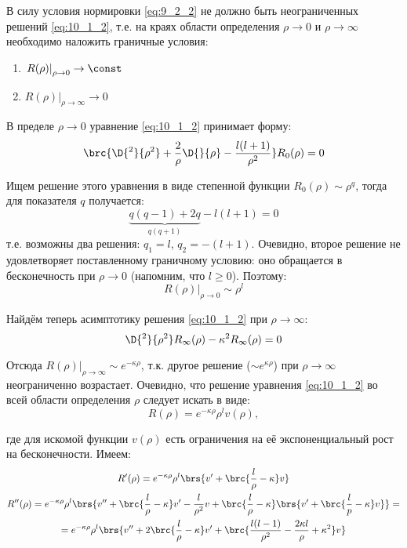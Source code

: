 В силу условия нормировки \eqref{eq:9_2_2} не должно быть неограниченных решений \eqref{eq:10_1_2}, т.е. на краях области определения $\rho \to 0$ и $\rho \to \infty$ необходимо наложить граничные условия:
\begin{enumerate}
\item $\left. R(\rho)\right|_{\rho \to 0} \to \const$
\item $\left. R(\rho)\right|_{\rho \to \infty} \to 0$
\end{enumerate}


В пределе $\rho \to 0$ уравнение \eqref{eq:10_1_2} принимает форму:
$$
\brc{\D{^2}{\rho^2} + \frac{2}{\rho}\D{}{\rho} - \frac{l(l+1)}{\rho^2}} R_0(\rho) = 0
$$

Ищем решение этого уравнения в виде степенной функции $R_0(\rho) \sim \rho^q$, тогда для показателя $q$ получается:
$$
\underbrace{q (q - 1) + 2q}_{q(q+1)} - l(l + 1) = 0
$$
т.е. возможны два решения: $q_1 = l$, $q_2 = -(l+1)$. Очевидно, второе решение не удовлетворяет поставленному граничному условию: оно обращается в бесконечность при $\rho \to 0$ (напомним, что $l \geqslant 0$). Поэтому:
$$
\boxed{
	\left. R(\rho)\right|_{\rho \to 0} \sim \rho^l
}
$$

Найдём теперь асимптотику решения \eqref{eq:10_1_2} при $\rho \to \infty$:
$$
\D{^2}{\rho^2}R_\infty(\rho) - \kappa^2 R_\infty(\rho) = 0
$$

Отсюда $\boxed{\left. R(\rho)\right|_{\rho \to \infty} \sim e^{-\kappa \rho}}$, т.к. другое решение ($\sim e^{\kappa \rho}$) при $\rho \to \infty$ неограниченно возрастает. Очевидно, что решение уравнения \eqref{eq:10_1_2} во всей области определения $\rho$ следует искать в виде:
\begin{equation}
\label{eq:10_2_1}
\boxed{
	R(\rho) = e^{-\kappa \rho} \rho^l v(\rho)
},
\end{equation}

где для искомой функции $v(\rho)$ есть ограничения на её экспоненциальный рост на бесконечности. Имеем:
$$
\begin{gathered}
R'(\rho) = e^{-\kappa \rho} \rho^l \brs{v' + \brc{\frac{l}{\rho} - \kappa} v}\\
R''(\rho) = e^{-\kappa \rho} \rho^l \brs{v'' + \brc{\frac{l}{\rho} - \kappa}v' - \frac{l}{\rho^2}v + \brc{\frac{l}{\rho} - \kappa} \brs{v' + \brc{\frac{l}{p} - \kappa}v} } = \\ = e^{-\kappa \rho} \rho^l \brs{v'' + 2 \brc{\frac{l}{\rho} - \kappa} v' + \brc{ \frac{l(l-1)}{\rho^2} - \frac{2\kappa l}{\rho} + \kappa^2 } v }
\end{gathered}
$$

